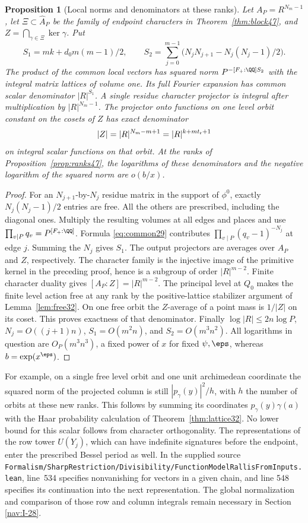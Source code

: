 \documentclass[a4paper,11pt]{article}
\newtheorem{proposition}{Proposition}[section]
\theoremstyle{definition}
\theoremstyle{remark}
\newcommand{\srcloc}[2]{{\small\nolinkurl{#1.lean}}, line~#2}
\numberwithin{equation}{section}
\begin{document}
\begin{proposition}[Local norms and denominators at these ranks]\label{prop:integral47}
Let \(A_P=R^{N_m-1}\), let \(\Xi\subset\widehat A_P\) be the family
of endpoint characters in Theorem~\ref{thm:block47}, and
\(Z=\bigcap_{\gamma\in\Xi}\ker\gamma\). Put
\[
 S_1=mk+d_0m(m-1)/2,\qquad
 S_2=\sum_{j=0}^{m-1}\bigl(N_jN_{j+1}-N_j(N_j-1)/2\bigr).
\]
The product of the common local vectors has squared norm
\(P^{-[F_+:\QQ]S_2}\) with the integral matrix lattices of volume one.
Its full Fourier expansion has common scalar denominator
\(|R|^{S_1}\). A single residue character projector is integral after
multiplication by \(|R|^{N_m-1}\). The projector onto functions on
one level orbit constant on the cosets of \(Z\) has exact denominator
\[
                         |Z|=|R|^{N_m-m+1}=|R|^{k+mt_{\rm r}+1}
\]
on integral scalar functions on that orbit. At the ranks of
Proposition~\ref{prop:ranks47}, the logarithms of these denominators
and the negative logarithm of the squared norm are \(o(b/x)\).
\end{proposition}
\begin{proof}
For an \(N_{j+1}\)-by-\(N_j\) residue matrix in the support of
\(\phi^0\), exactly \(N_j(N_j-1)/2\) entries are free. All the others
are prescribed, including the diagonal ones. Multiply the resulting
volumes at all edges and places and use \(\prod_{v\mid P}q_v=P^{[F_+:\QQ]}\).
Formula \eqref{eq:common29} contributes
\(\prod_{v\mid P}(q_v-1)^{-N_j}\) at edge \(j\). Summing the \(N_j\)
gives \(S_1\). The output projectors are averages over \(A_P\) and
\(Z\), respectively. The character family is the injective image of
the primitive kernel in the preceding proof, hence is a subgroup of
order \(|R|^{m-2}\). Finite character duality gives
\([A_P:Z]=|R|^{m-2}\). The principal level at \(Q_0\) makes the finite
level action free at any rank by the positive-lattice stabilizer
argument of Lemma~\ref{lem:free32}. On one free orbit the \(Z\)-average
of a point mass is \(1/|Z|\) on its coset. This proves exactness of
that denominator. Finally \(\log|R|\le 2n\log P\),
\(N_j=O((j+1)n)\), \(S_1=O(m^2n)\), and \(S_2=O(m^3n^2)\).
All logarithms in question are \(O_P(m^3n^3)\), a fixed power of \(x\)
for fixed \(\psi,\eps\), whereas \(b=\exp(x^\eps)\).
\end{proof}

For example, on a single free level orbit and one unit archimedean
coordinate the squared norm of the projected column is still
\(|p_\gamma(y)|^2/h\), with \(h\) the number of orbits at these new
ranks. This follows by summing its coordinates
\(p_\gamma(y)\gamma(a)\) with the Haar probability calculation of
Theorem~\ref{thm:lattice32}. No lower bound for this scalar follows
from character orthogonality. The representations of the row tower
\(U(Y_j)\), which can have indefinite signatures before the endpoint,
enter the prescribed Bessel period as well. In the supplied source
\srcloc{Formalism/SharpRestriction/Divisibility/FunctionModelRallisFromInputs}{534}
specifies nonvanishing for vectors in a given chain, and line 548
specifies its continuation into the next representation. The global
normalization and comparison of those row and column integrals remain
necessary in Section \ref{nav:I-28}.
\end{document}
